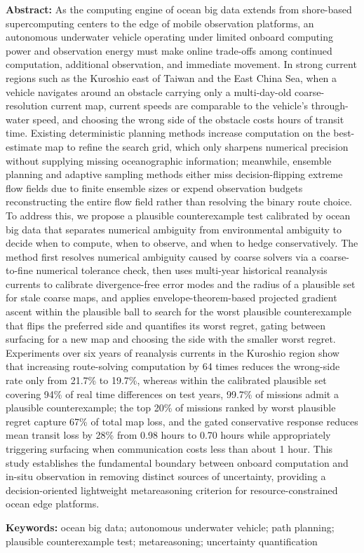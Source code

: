 {\bfseries Abstract:}
As the computing engine of ocean big data extends from shore-based supercomputing centers to the edge of mobile observation platforms, an autonomous underwater vehicle operating under limited onboard computing power and observation energy must make online trade-offs among continued computation, additional observation, and immediate movement. In strong current regions such as the Kuroshio east of Taiwan and the East China Sea, when a vehicle navigates around an obstacle carrying only a multi-day-old coarse-resolution current map, current speeds are comparable to the vehicle's through-water speed, and choosing the wrong side of the obstacle costs hours of transit time. Existing deterministic planning methods increase computation on the best-estimate map to refine the search grid, which only sharpens numerical precision without supplying missing oceanographic information; meanwhile, ensemble planning and adaptive sampling methods either miss decision-flipping extreme flow fields due to finite ensemble sizes or expend observation budgets reconstructing the entire flow field rather than resolving the binary route choice. To address this, we propose a plausible counterexample test calibrated by ocean big data that separates numerical ambiguity from environmental ambiguity to decide when to compute, when to observe, and when to hedge conservatively. The method first resolves numerical ambiguity caused by coarse solvers via a coarse-to-fine numerical tolerance check, then uses multi-year historical reanalysis currents to calibrate divergence-free error modes and the radius of a plausible set for stale coarse maps, and applies envelope-theorem-based projected gradient ascent within the plausible ball to search for the worst plausible counterexample that flips the preferred side and quantifies its worst regret, gating between surfacing for a new map and choosing the side with the smaller worst regret. Experiments over six years of reanalysis currents in the Kuroshio region show that increasing route-solving computation by 64 times reduces the wrong-side rate only from 21.7\% to 19.7\%, whereas within the calibrated plausible set covering 94\% of real time differences on test years, 99.7\% of missions admit a plausible counterexample; the top 20\% of missions ranked by worst plausible regret capture 67\% of total map loss, and the gated conservative response reduces mean transit loss by 28\% from 0.98 hours to 0.70 hours while appropriately triggering surfacing when communication costs less than about 1 hour. This study establishes the fundamental boundary between onboard computation and in-situ observation in removing distinct sources of uncertainty, providing a decision-oriented lightweight metareasoning criterion for resource-constrained ocean edge platforms.

{\bfseries Keywords:} ocean big data; autonomous underwater vehicle; path planning; plausible counterexample test; metareasoning; uncertainty quantification
